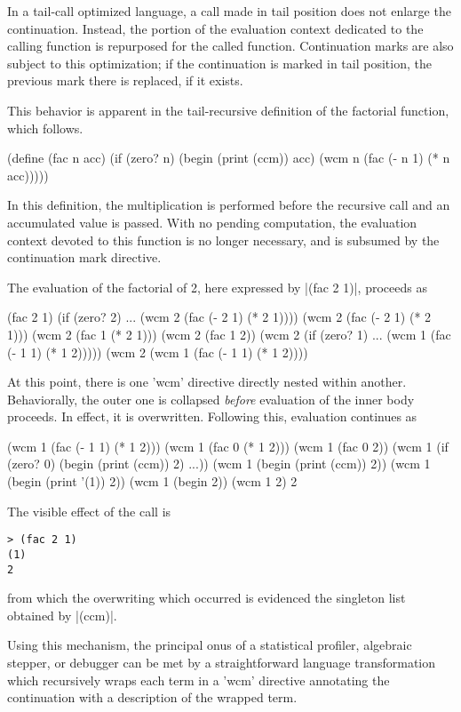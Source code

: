 \documentclass{llncs}
\begin{document}
In a tail-call optimized language, a call made in tail position does not enlarge the continuation. Instead, the portion of the evaluation context dedicated to the calling function is repurposed for the called function. Continuation marks are also subject to this optimization; if the continuation is marked in tail position, the previous mark there is replaced, if it exists.

This behavior is apparent in the tail-recursive definition of the factorial function, which follows.
\begin{schemedisplay}
(define (fac n acc)
  (if (zero? n)
      (begin
        (print (ccm))
        acc)
      (wcm n (fac (- n 1) (* n acc)))))
\end{schemedisplay}
In this definition, the multiplication is performed before the recursive call and an accumulated value is passed. With no pending computation, the evaluation context devoted to this function is no longer necessary, and is subsumed by the continuation mark directive.

The evaluation of the factorial of 2, here expressed by \scheme|(fac 2 1)|, proceeds as
\begin{schemedisplay}
(fac 2 1)
(if (zero? 2) ... (wcm 2 (fac (- 2 1) (* 2 1))))
(wcm 2 (fac (- 2 1) (* 2 1)))
(wcm 2 (fac 1 (* 2 1)))
(wcm 2 (fac 1 2))
(wcm 2 (if (zero? 1) ... (wcm 1 (fac (- 1 1) (* 1 2)))))
(wcm 2 (wcm 1 (fac (- 1 1) (* 1 2))))
\end{schemedisplay}
At this point, there is one \scheme'wcm' directive directly nested within another. Behaviorally, the outer one is collapsed \emph{before} evaluation of the inner body proceeds. In effect, it is overwritten. Following this, evaluation continues as
\begin{schemedisplay}
(wcm 1 (fac (- 1 1) (* 1 2)))
(wcm 1 (fac 0 (* 1 2)))
(wcm 1 (fac 0 2))
(wcm 1 (if (zero? 0) (begin (print (ccm)) 2) ...))
(wcm 1 (begin (print (ccm)) 2))
(wcm 1 (begin (print '(1)) 2))
(wcm 1 (begin 2))
(wcm 1 2)
2
\end{schemedisplay}
The visible effect of the call is
\begin{verbatim}
> (fac 2 1)
(1)
2
\end{verbatim}
from which the overwriting which occurred is evidenced the singleton list obtained by \scheme|(ccm)|.

Using this mechanism, the principal onus of a statistical profiler, algebraic stepper, or debugger can be met by a straightforward language transformation which recursively wraps each term in a \scheme'wcm' directive annotating the continuation with a description of the wrapped term.
\end{document}
